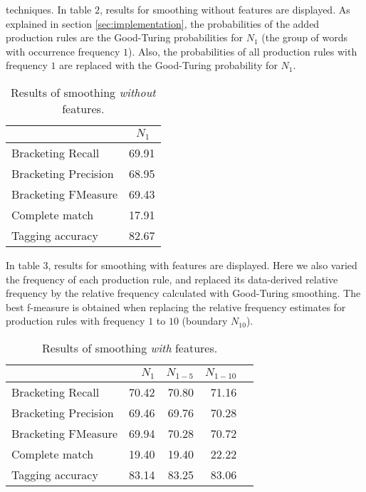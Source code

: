 \documentclass[11pt,twocolumn]{article}
\begin{document}
		techniques. In table $2$, results for smoothing without features are displayed. As explained in
		section \ref{sec:implementation}, the probabilities of the added production rules are the
		Good-Turing probabilities for $N_1$ (the group of words with occurrence frequency $1$). Also,
		the probabilities of all production rules with frequency $1$ are replaced with the Good-Turing
		probability for $N_1$.
		\begin{table}[H] %
			\begin{center}
				\begin{tabular}{|l|r|}
					\hline
											  & $N_1 \;\,$\\
					\hline
					Bracketing Recall         &  69.91  \\
					Bracketing Precision      &  68.95  \\
					Bracketing FMeasure       &  69.43  \\
					Complete match            &  17.91  \\
					Tagging accuracy          &  82.67  \\
					\hline
				\end{tabular}
				\caption{Results of smoothing \textit{without} features.}
			\end{center}
			\label{table:table2}
		\end{table}        
		\noindent
		In table $3$, results for smoothing with features are displayed. Here we also varied the frequency
		of each production rule, and replaced its data-derived relative frequency by the relative frequency
		calculated with Good-Turing smoothing. The best f-measure is obtained when replacing the relative
		frequency estimates for production rules with frequency $1$ to $10$ (boundary $N_{10}$).
		\begin{table}[H] %
			\begin{center}
				\begin{tabular}{|l|r|r|r|r|}
					\hline
											  & $N_1$\; & $N_{1-5}$ &$N_{1-10}$\\
					\hline
					Bracketing Recall         & 70.42 & 70.80 & 71.16\\
					Bracketing Precision      & 69.46 & 69.76 & 70.28\\
					Bracketing FMeasure       & 69.94 & 70.28 & 70.72\\
					Complete match            & 19.40 & 19.40 & 22.22\\
					Tagging accuracy          & 83.14 & 83.25 & 83.06\\
					\hline
				\end{tabular}
				\caption{Results of smoothing \textit{with} features.}
			\end{center}
			\label{table:table3}
		\end{table}
\end{document}
